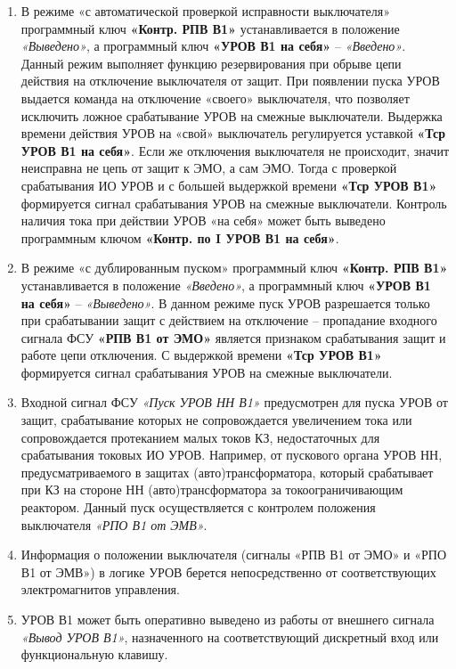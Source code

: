 \begin{enumerate}[label=\arabic{section}.\arabic{subsection}.\arabic{enumi}, labelsep=4pt, leftmargin=0pt, itemindent=57pt, itemsep=0pt, parsep=0pt]
\item
В режиме «с автоматической проверкой исправности выключателя» программный ключ \textbf{«Контр. РПВ В1»} устанавливается в положение \textit{«Выведено»}, а программный ключ \textbf{«УРОВ В1 на себя»} -- \textit{«Введено»}. Данный режим выполняет функцию резервирования при обрыве цепи действия на отключение выключателя от защит. При появлении пуска УРОВ выдается команда на отключение «своего» выключателя, что позволяет исключить ложное срабатывание УРОВ на смежные выключатели. Выдержка времени действия 
УРОВ на «свой» выключатель регулируется уставкой \textbf{«Тср УРОВ В1 на себя»}. Если же отключения выключателя не происходит, значит неисправна не цепь от защит к ЭМО, а сам ЭМО. Тогда с проверкой срабатывания ИО УРОВ и с большей выдержкой времени \textbf{«Тср УРОВ В1»} формируется сигнал срабатывания УРОВ на смежные выключатели. Контроль наличия тока при действии УРОВ «на себя» может быть выведено программным ключом \textbf{«Контр. по I УРОВ В1 на себя»}.

\item
В режиме «с дублированным пуском» программный ключ \textbf{«Контр. РПВ В1»} устанавливается в положение \textit{«Введено»}, а программный ключ \textbf{«УРОВ В1 на себя»} – \textit{«Выведено»}. В данном режиме пуск УРОВ разрешается только при срабатывании защит с действием на отключение – пропадание входного сигнала ФСУ \textbf{«РПВ В1 от ЭМО»} является признаком срабатывания защит и работе цепи отключения. С выдержкой времени \textbf{«Тср УРОВ В1»} формируется сигнал срабатывания УРОВ на смежные выключатели.

\item
Входной сигнал ФСУ \textit{«Пуск УРОВ НН В1»} предусмотрен для пуска УРОВ от защит, срабатывание которых не сопровождается увеличением тока или сопровождается протеканием малых токов КЗ, недостаточных для срабатывания токовых ИО УРОВ. Например, от пускового органа УРОВ НН, предусматриваемого в защитах (авто)трансформатора, который срабатывает при КЗ на стороне НН (авто)трансформатора за токоограничивающим реактором. Данный пуск осуществляется с контролем положения выключателя \textit{«РПО В1 от ЭМВ»}.

\item
Информация о положении выключателя (сигналы «РПВ В1 от ЭМО» и «РПО В1 от ЭМВ») в логике УРОВ берется непосредственно от соответствующих электромагнитов управления.

\item
УРОВ В1 может быть оперативно выведено из работы от внешнего сигнала \textit{«Вывод УРОВ В1»}, назначенного на соответствующий дискретный вход или функциональную клавишу.


\end{enumerate}
